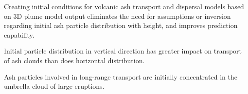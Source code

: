 \documentclass[draft,linenumbers]{agujournal2019}
\begin{document}




\begin{keypoints}
\item Creating initial conditions for volcanic ash transport and dispersal models based on 3D plume model output eliminates the need for assumptions or inversion regarding initial ash particle distribution with height, and improves prediction capability.
\item Initial particle distribution in vertical direction has greater impact on transport of ash clouds than does horizontal distribution.
\item Ash particles involved in long-range transport are initially concentrated in the umbrella cloud of large eruptions.
\end{keypoints}

%
%

\end{document}
